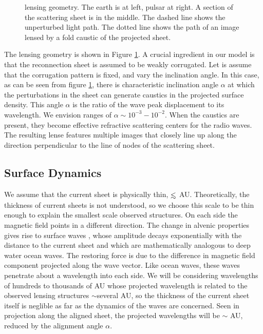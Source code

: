 \documentclass[useAMS,usenatbib]{mn2e}
\def\lesssim{\mathrel{\hbox{\rlap{\hbox{\lower4pt\hbox{$\sim$}}}\hbox{$<$}}}}
\begin{document}

\begin{figure}
\centerline{}
\vspace{-6in}
\caption{lensing geometry.  The earth is at left, pulsar at right.
A section of the scattering sheet is in the middle.  The dashed line 
shows the  unperturbed light path.  The dotted line shows the path of 
an image
lensed by a fold caustic of the projected sheet.}
\label{fig:sheetgeom}
\end{figure}

The lensing geometry is shown in Figure \ref{fig:sheetgeom}. A crucial ingredient in our model
is that the reconnection sheet is assumed to be weakly corrugated. Let is assume that the corrugation
pattern is fixed, and vary the inclination angle. In this case, as can be seen from 
figure \ref{fig:sheetgeom},
there is characteristic inclination angle $\alpha$ at which the perturbations in the
sheet can generate caustics in the projected surface density.  This
angle $\alpha$ is the ratio of the wave peak displacement to its
wavelength.  We envision ranges of $\alpha \sim 10^{-3} - 10^{-2}$.
When the caustics are present, they
become effective refractive scattering centers for the radio waves. The resulting lense features
multiple images that closely line up along the direction perpendicular to the line of nodes of the
scattering sheet.


\subsection{Surface Dynamics}

We assume that the current sheet is physically thin, $\lesssim $ AU.  Theoretically,
the thickness of current sheets is not understood, so we choose this
scale to be thin enough to explain the smallest scale observed
structures.  On each side the
magnetic field points in a different direction.  The change in alvenic
properties gives rise to surface
waves \citep{1991SoPh..133..263J, 2009GApFD.103...89J}, whose amplitude
decays exponentially with the distance to the current sheet and which are
mathematically analogous to deep water ocean waves.  The restoring force is due to the
difference in magnetic field component projected along the wave
vector.  Like ocean waves, these waves penetrate about a wavelength
into each side.  We will be considering wavelengths of hundreds to thousands of
AU whose projected wavelength is related to the observed lensing
structures  $\sim$several AU, so the thickness of the current sheet itself is
neglible as far as the dynamics of 
the waves are concerned.  Seen in projection along the aligned sheet,
the projected wavelengths will be $\sim $ AU, reduced by the alignment
angle $\alpha$.
\end{document}
